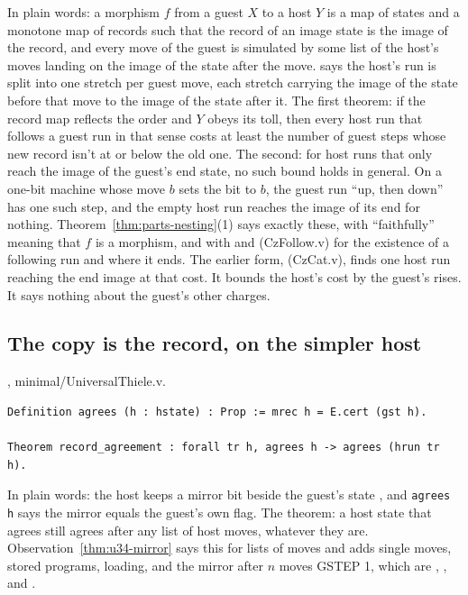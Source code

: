 In plain words: a morphism $f$ from a guest $X$ to a host $Y$ is a map of states and a monotone
map of records such that the record of an image state is the image of the record, and every move
of the guest is simulated by some list of the host's moves landing on the image of the state
after the move.  says the host's run is split into one stretch per
guest move, each stretch carrying the image of the state before that move to the image of the
state after it. The first theorem: if the record map reflects the order and $Y$ obeys its toll,
then every host run that follows a guest run in that sense costs at least the number of guest
steps whose new record isn't at or below the old one. The second: for host runs that only reach
the image of the guest's end state, no such bound holds in general. On a one-bit machine whose
move $b$ sets the bit to $b$, the guest run ``up, then down'' has one such step, and the empty host
run reaches the image of its end for nothing. Theorem~\ref{thm:parts-nesting}(1) says exactly
these, with ``faithfully'' meaning that $f$ is a morphism, and with  and
 (CzFollow.v) for the existence of a following run and where it ends.
The earlier form,  (CzCat.v), finds one host run reaching the end
image at that cost. It bounds the host's cost by the guest's rises. It says nothing about the
guest's other charges.

\subsection{The copy is the record, on the simpler host}

{\raggedright {}, minimal/UniversalThiele.v.\par}

{\footnotesize
\begin{verbatim}
Definition agrees (h : hstate) : Prop := mrec h = E.cert (gst h).

Theorem record_agreement : forall tr h, agrees h -> agrees (hrun tr h).
\end{verbatim}}

In plain words: the host keeps a mirror bit  beside the guest's state ,
and \texttt{agrees h} says the mirror equals the guest's own flag. The theorem: a host state that
agrees still agrees after any list of host moves, whatever they are.
Observation~\ref{thm:u34-mirror} says this for lists of moves and adds single moves, stored programs, loading,
and the mirror after $n$ moves GSTEP 1,
which are , ,  and .

